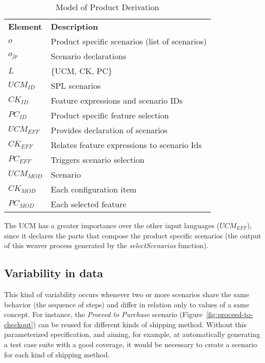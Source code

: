 \begin{table}[htb]
\begin{center}
\caption{Model of Product Derivation} \label{tab:vf-weaver}
\begin{tabular}{p{0.6in}p{2.4in}}
   \hline\noalign{\smallskip}
  {\bf Element} & {\bf Description} \\
   \noalign{\smallskip}
   \hline
   \noalign{\smallskip}
   $o$              & Product specific scenarios (list of scenarios) \\
   $o_{jp}$        	& Scenario declarations \\
   $L$              & \{UCM, CK, PC\} \\
   $UCM_{ID}$ 		& SPL scenarios \\
   $CK_{ID}$    	& Feature expressions and scenario IDs\\
   $PC_{ID}$    	& Product specific feature selection \\
   $UCM_{EFF}$ 		& Provides declaration of scenarios \\
   $CK_{EFF}$    	& Relates feature expressions to scenario Ids  \\
   $PC_{EFF}$    	& Triggers scenario selection \\
   $UCM_{MOD}$ 		& Scenario \\
   $CK_{MOD}$    	& Each configuration item  \\
   $PC_{MOD}$    	& Each selected feature \\
  \hline
  \end{tabular}
\end{center}
\end{table}

The UCM has a greater importance over the other input languages ($UCM_{EFF}$),
since it declares the parts that compose the product specific scenarios (the
output of this weaver process generated by the \emph{selectScenarios} function).

\subsection{Variability in data}\label{sub:bind-weaver}

This kind of variability occurs whenever two or more scenarios share the same
behavior (the sequence of steps) and differ in relation only to values of a same
concept. For instance, the \emph{Proceed to Purchase} scenario
(Figure~\ref{fig:proceed-to-checkout}) can be reused for different kinds
of shipping method. Without this parameterized specification, and aiming, for
example, at automatically generating a test case suite with a good coverage, it
would be necessary to create a scenario for each kind of shipping method.


